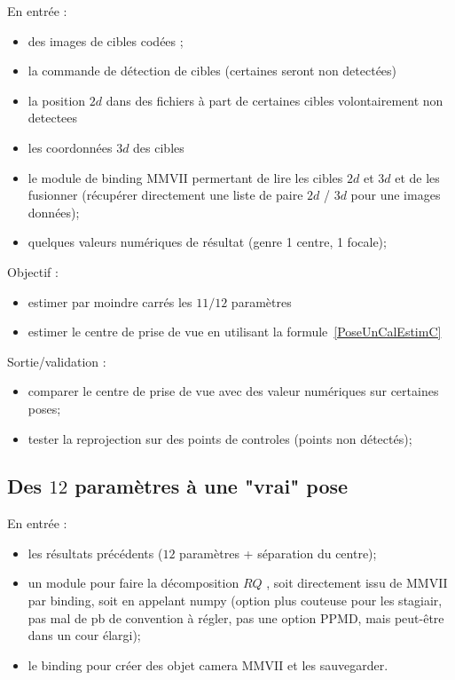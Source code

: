 En entrée :

\begin{itemize}
   \item des images de cibles codées ;
   \item la commande  de détection de cibles  (certaines seront non detectées)
   \item la position $2d$ dans des fichiers à part de certaines cibles volontairement non detectees
   \item les coordonnées $3d$ des cibles
   \item le module de binding MMVII permertant de lire les cibles $2d$ et $3d$ et de les fusionner
         (récupérer directement une liste de paire $2d$ / $ 3d$ pour une images données);
    \item quelques valeurs numériques de résultat (genre 1 centre, 1 focale);
\end{itemize}

Objectif :

\begin{itemize}
    \item  estimer par moindre carrés les $11/12$ paramètres 
    \item  estimer le centre de prise de vue en utilisant la formule~\ref{PoseUnCalEstimC}
\end{itemize}

Sortie/validation :

\begin{itemize}
    \item  comparer le centre de prise de vue avec des valeur numériques sur certaines poses;
    \item  tester la reprojection sur des points de controles (points non détectés);
\end{itemize}


\subsection{Des $12$ paramètres à une "vrai" pose}

\label{From12PtoPose}
En entrée :

\begin{itemize}
    \item les résultats précédents ($12$ paramètres + séparation du centre);
    \item un module pour faire la décomposition $RQ$ , soit directement issu de MMVII par
          binding, soit en appelant numpy (option plus couteuse pour les stagiair, pas mal de pb 
          de convention à régler, pas une option PPMD, mais peut-être dans un cour élargi);
    \item le binding pour créer des objet  camera MMVII et les sauvegarder.
\end{itemize}

